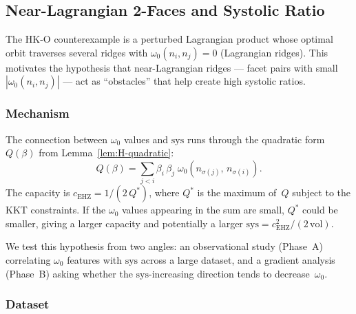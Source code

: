 %
%
%

\subsection{Near-Lagrangian 2-Faces and Systolic Ratio}
\label{sec:omega-obstacle}

The HK-O counterexample is a perturbed Lagrangian product whose
optimal orbit traverses several ridges with $\omega_0(n_i, n_j) = 0$
(Lagrangian ridges).
This motivates the hypothesis that near-Lagrangian ridges --- facet
pairs with small $|\omega_0(n_i, n_j)|$ --- act as ``obstacles'' that
help create high systolic ratios.

\subsubsection*{Mechanism}

The connection between $\omega_0$ values and $\mathrm{sys}$ runs through
the quadratic form $Q(\beta)$ from Lemma~\ref{lem:H-quadratic}:
\[
  Q(\beta)
  = \sum_{j < i} \beta_i\,\beta_j\;\omega_0(n_{\sigma(j)},\, n_{\sigma(i)}).
\]
The capacity is $c_{\mathrm{EHZ}} = 1/(2\,Q^*)$, where $Q^*$ is the
maximum of~$Q$ subject to the KKT constraints.
If the $\omega_0$ values appearing in the sum are small, $Q^*$ could be
smaller, giving a larger capacity and potentially a larger
$\mathrm{sys} = c_{\mathrm{EHZ}}^2 / (2\,\mathrm{vol})$.

We test this hypothesis from two angles: an observational study
(Phase~A) correlating $\omega_0$ features with $\mathrm{sys}$ across a
large dataset, and a gradient analysis (Phase~B) asking whether the
$\mathrm{sys}$-increasing direction tends to decrease~$\omega_0$.

\subsubsection*{Dataset}

